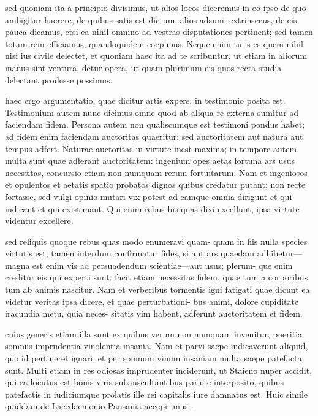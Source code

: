 sed quoniam ita a principio divisimus, ut alios locos diceremus in eo ipso de quo ambigitur haerere, de quibus satis est dictum, alios adsumi extrinsecus, de eis pauca dicamus, etsi ea nihil omnino ad vestras disputationes pertinent; sed tamen totam rem efficiamus, quandoquidem coepimus. Neque enim tu is es quem nihil nisi ius civile delectet, et quoniam haec ita ad te scribuntur, ut etiam in aliorum manus sint ventura, detur opera, ut quam plurimum eis quos recta studia delectant prodesse possimus.

 haec ergo argumentatio, quae dicitur artis expers, in testimonio posita est. Testimonium autem nunc dicimus omne quod ab aliqua re externa sumitur ad faciendam fidem. Persona autem non qualiscumque est testimoni pondus habet; ad fidem enim faciendam auctoritas quaeritur; sed auctoritatem aut natura aut tempus adfert. Naturae auctoritas in virtute inest maxima; in tempore autem multa sunt quae adferant auctoritatem: ingenium opes aetas fortuna ars usus necessitas, concursio etiam non numquam rerum fortuitarum. Nam et ingeniosos et opulentos et aetatis spatio probatos dignos quibus credatur putant; non recte fortasse, sed vulgi opinio mutari vix potest ad eamque omnia dirigunt et qui iudicant et qui existimant. Qui enim rebus his quas dixi excellunt, ipsa virtute videntur excellere.

 sed reliquis quoque rebus quas modo enumeravi quam- quam in his nulla species virtutis est, tamen interdum confirmatur fides, si aut ars quaedam adhibetur—magna est enim vis ad persuadendum scientiae—aut usus; plerum- que enim creditur eis qui experti sunt. facit etiam necessitas fidem, quae tum a corporibus tum ab animis nascitur. Nam et verberibus tormentis igni fatigati quae dicunt ea videtur veritas ipsa dicere, et quae perturbationi- bus animi, dolore cupiditate iracundia metu, quia neces- sitatis vim habent, adferunt auctoritatem et fidem.

 cuius generis etiam illa sunt ex quibus verum non numquam invenitur, pueritia somnus imprudentia vinolentia insania. Nam et parvi saepe indicaverunt aliquid, quo id pertineret ignari, et per somnum vinum insaniam multa saepe patefacta sunt. Multi etiam in res odiosas imprudenter inciderunt, ut Staieno nuper accidit, qui ea locutus est bonis viris subauscultantibus pariete interposito, quibus patefactis in iudiciumque prolatis ille rei capitalis iure damnatus est. Huic simile quiddam de Lacedaemonio Pausania accepi- mus .

